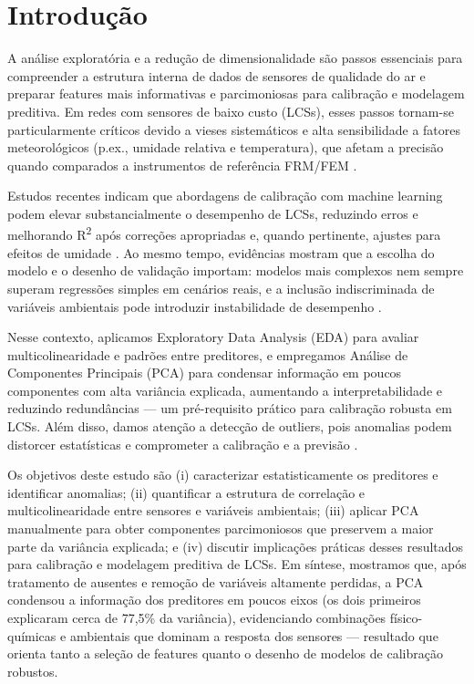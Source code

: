 \section{Introdução}
\label{sec:introducao}
A análise exploratória e a redução de dimensionalidade são passos essenciais para compreender a estrutura interna de dados de sensores de qualidade do ar e preparar features mais informativas e parcimoniosas para calibração e modelagem preditiva. Em redes com sensores de baixo custo (LCSs), esses passos tornam-se particularmente críticos devido a vieses sistemáticos e alta sensibilidade a fatores meteorológicos (p.ex., umidade relativa e temperatura), que afetam a precisão quando comparados a instrumentos de referência FRM/FEM \cite{Ravindra2024,Sousan2025}.

Estudos recentes indicam que abordagens de calibração com machine learning podem elevar substancialmente o desempenho de LCSs, reduzindo erros e melhorando R\textsuperscript{2} após correções apropriadas e, quando pertinente, ajustes para efeitos de umidade \cite{Ravindra2024,Sousan2025}. Ao mesmo tempo, evidências mostram que a escolha do modelo e o desenho de validação importam: modelos mais complexos nem sempre superam regressões simples em cenários reais, e a inclusão indiscriminada de variáveis ambientais pode introduzir instabilidade de desempenho \cite{Dong2025}.

Nesse contexto, aplicamos Exploratory Data Analysis (EDA) para avaliar multicolinearidade e padrões entre preditores, e empregamos Análise de Componentes Principais (PCA) para condensar informação em poucos componentes com alta variância explicada, aumentando a interpretabilidade e reduzindo redundâncias — um pré-requisito prático para calibração robusta em LCSs. Além disso, damos atenção a detecção de outliers, pois anomalias podem distorcer estatísticas e comprometer a calibração e a previsão \cite{Aiyenuro2025,EDA2024}.

Os objetivos deste estudo são (i) caracterizar estatisticamente os preditores e identificar anomalias; (ii) quantificar a estrutura de correlação e multicolinearidade entre sensores e variáveis ambientais; (iii) aplicar PCA manualmente para obter componentes parcimoniosos que preservem a maior parte da variância explicada; e (iv) discutir implicações práticas desses resultados para calibração e modelagem preditiva de LCSs. Em síntese, mostramos que, após tratamento de ausentes e remoção de variáveis altamente perdidas, a PCA condensou a informação dos preditores em poucos eixos (os dois primeiros explicaram cerca de 77,5\% da variância), evidenciando combinações físico-químicas e ambientais que dominam a resposta dos sensores — resultado que orienta tanto a seleção de features quanto o desenho de modelos de calibração robustos.